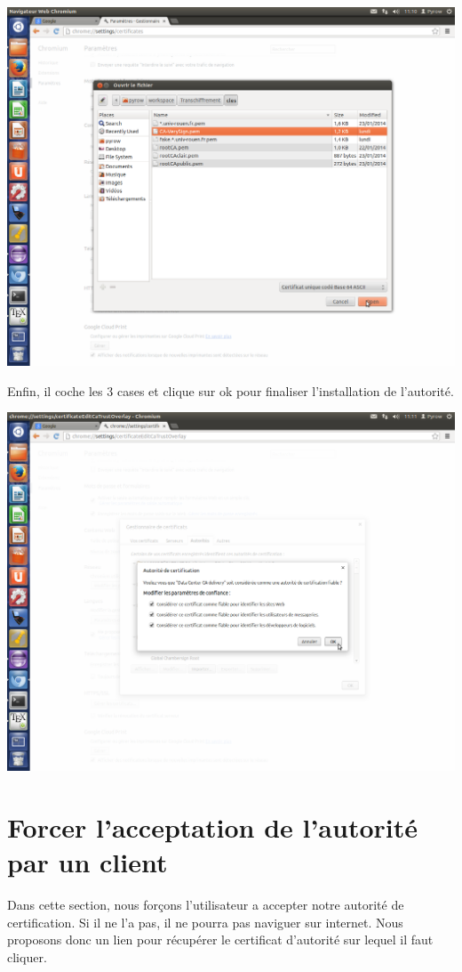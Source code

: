 \documentclass[a4paper,11pt,french]{book}
\begin{document}
\includegraphics[width=\textwidth]{images/ChromeImport.png} 
\newpage

Enfin, il coche les 3 cases et clique sur ok pour finaliser l'installation de l'autorité.

\includegraphics[width=\textwidth]{images/ChromeValide.png} 
\newpage

\section{Forcer l'acceptation de l'autorité par un client}
Dans cette section, nous forçons l'utilisateur a accepter notre autorité de certification. Si il ne l'a pas, il ne pourra pas naviguer sur internet.
Nous proposons donc un lien pour récupérer le certificat d'autorité sur lequel il faut cliquer.
\end{document}
